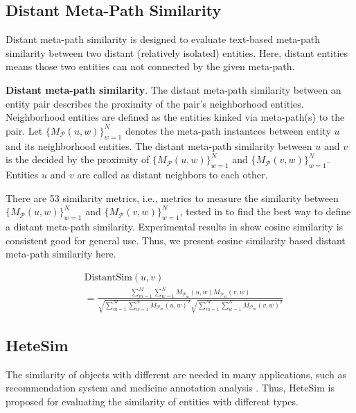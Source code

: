 \documentclass{acm_proc_article-csis8101}
\begin{document}
\subsection{Distant Meta-Path Similarity}
Distant meta-path similarity\cite{wang2017distant} is designed to evaluate text-based meta-path similarity between two distant (relatively isolated) entities. Here, distant entities means those two entities can not connected by the given meta-path.

\begin{definition}
{\bf Distant meta-path similarity}. The distant meta-path similarity between an entity pair describes the proximity of the pair's neighborhood entities. Neighborhood entities are defined as the entities kinked via meta-path(s) to the pair. Let $\{M_{\mathcal{P}}(u, w)\}^{N}_{w=1}$ denotes the meta-path instantces between entity $u$ and its neighborhood entities. The distant meta-path similarity between $u$ and $v$ is the decided by the proximity of $\{M_{\mathcal{P}}(u, w)\}^{N}_{w=1}$ and $\{M_{\mathcal{P}}(v, w)\}^{N}_{w=1}$. Entities $u$ and $v$ are called as distant neighbors to each other.
\end{definition}

There are 53 similarity metrics, i.e., metrics to measure the similarity between $\{M_{\mathcal{P}}(u, w)\}^{N}_{w=1}$ and $\{M_{\mathcal{P}}(v, w)\}^{N}_{w=1}$, tested in \cite{wang2017distant} to find the best way to define a distant meta-path similarity. Experimental results in \cite{wang2017distant} show cosine similarity is consistent good for general use. Thus, we present cosine similarity based distant meta-path similarity here.

\begin{equation}
\begin{split}
& \text{DistantSim}(u, v) \\
& = \frac{\sum^{M}_{m=1}\sum^{N}_{w=1}M_{\mathcal{P}_{m}}(u,w)M_{\mathcal{P}_{m}}(v,w)}{\sqrt{\sum^{M}_{m=1}\sum^{N}_{w=1}M_{\mathcal{P}_{m}}(u,w)^2}\sqrt{\sum^{M}_{m=1}\sum^{N}_{w=1}M_{\mathcal{P}_{m}}(v,w)^2}}
\end{split}
\end{equation}

\subsection{HeteSim}
The similarity of objects with different are needed in many applications, such as recommendation system \cite{jamali2013heteromf} and medicine annotation analysis \cite{palma2013measuring}. Thus, HeteSim \cite{shi2014hetesim} is proposed for evaluating the similarity of entities with different types.
\end{document}
